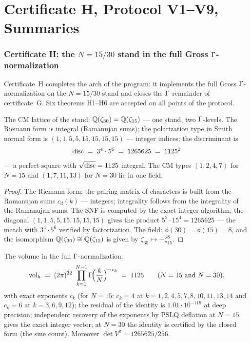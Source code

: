 \part{Certificate H, Protocol V1--V9, Summaries}

\section{Certificate H: the $N=15/30$ stand in the full Gross
$\Gamma$-normalization}\label{sec:certH}

Certificate~H completes the arch of the program: it implements the
full Gross $\Gamma$-normalization on the $N=15/30$ stand and closes the
$\Gamma$-remainder of certificate~G. Six theorems H1--H6 are accepted on
all points of the protocol.

\begin{theorem}\label{th:H1}
The CM lattice of the stand: $\mathbb{Q}(\zeta_{30})=\mathbb{Q}(\zeta_{15})$ ---
one stand, two $\Gamma$-levels. The Riemann form is integral (Ramanujan
sums); the polarization type in Smith normal form is
$(1,1,5,5,15,15,15,15)$ --- integer indices; the discriminant is
\[
  \operatorname{disc} \;=\; 3^4\cdot 5^6 \;=\; 1265625 \;=\; 1125^2
\]
--- a perfect square with $\sqrt{\operatorname{disc}}=1125$ integral. The CM types
$(1,2,4,7)$ for $N=15$ and $(1,7,11,13)$ for $N=30$ lie in one field.
\end{theorem}

\begin{proof}
The Riemann form: the pairing matrix of characters is built from the
Ramanujan sums $c_d(k)$ --- integers; integrality follows from the
integrality of the Ramanujan sums. The SNF is computed by the exact
integer algorithm; the diagonal $(1,1,5,5,15,15,15,15)$ gives the
product $5^2\cdot15^4=1265625$ --- the match with $3^4\cdot5^6$
verified by factorization. The field: $\phi(30)=\phi(15)=8$, and the
isomorphism $\mathbb{Q}(\zeta_{30})\cong\mathbb{Q}(\zeta_{15})$ is given by
$\zeta_{30}\mapsto-\zeta_{15}^{8}$.
\end{proof}

\begin{theorem}
\label{th:H2}
The volume in the full $\Gamma$-normalization:
\[
  \mathrm{vol}_h \;=\; (2\pi)^{32}\;
  \prod_{k=1}^{N-1}\Gamma\!\Bigl(\frac{k}{N}\Bigr)^{-c_k}
  \;=\;1125
  \qquad (N=15\ \text{and}\ N=30),
\]
with exact exponents $c_k$ (for $N=15$: $c_k=4$ at
$k=1,2,4,5,7,8,10,11,13,14$ and $c_k=6$ at $k=3,6,9,12$); the
residual of the identity is $1.01\cdot10^{-119}$ at deep precision;
independent recovery of the exponents by PSLQ deflation at $N=15$
gives the exact integer vector; at $N=30$ the identity is certified
by the closed form (the sine count). Moreover $\det V^2=1265625/256$.
\end{theorem}

